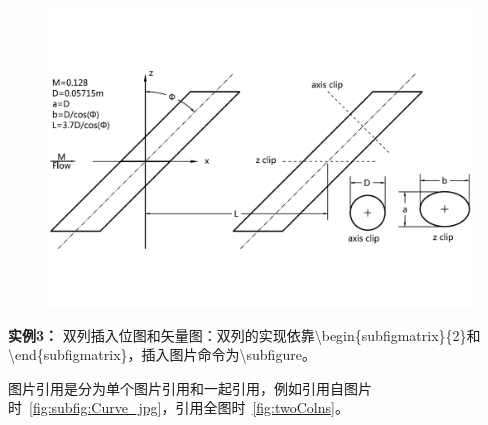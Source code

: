 \begin{figure}[htb]
\centering
   \includegraphics[width=12cm]{./img/Geom_pdf}
  \label{fig:visual}
\end{figure}

{\bf{实例3：}} 双列插入位图和矢量图：双列的实现依靠\textbackslash begin\{subfigmatrix\}\{2\}和\textbackslash end\{subfigmatrix\}，插入图片命令为\textbackslash subfigure。

图片引用是分为单个图片引用和一起引用，例如引用自图片时~\ref{fig:subfig:Curve_jpg}，引用全图时~\ref{fig:twoColns}。


